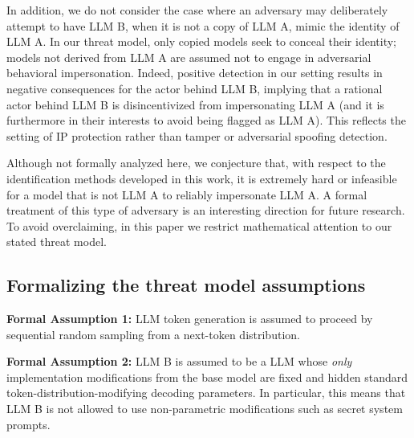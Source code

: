 \documentclass{article}
\begin{document}
In addition, we do not consider the case where an adversary may deliberately attempt to have LLM B, when it is not a copy of LLM A, mimic the identity of LLM A. In our threat model, only copied models seek to conceal their identity; models not derived from LLM A are assumed not to engage in adversarial behavioral impersonation. Indeed, positive detection in our setting results in negative consequences for the actor behind LLM B, implying that a rational actor behind LLM B is disincentivized from impersonating LLM A (and it is furthermore in their interests to avoid being flagged as LLM A). This reflects the setting of IP protection rather than tamper or adversarial spoofing detection.



Although not formally analyzed here, we conjecture that, with respect to the identification methods developed in this work, it is extremely hard or infeasible for a model that is not LLM A to reliably impersonate LLM A. A formal treatment of this type of adversary is an interesting direction for future research. To avoid overclaiming, in this paper we restrict mathematical attention to our stated threat model.



\subsection{Formalizing the threat model assumptions}

\textbf{Formal Assumption 1:} LLM token generation is assumed to proceed by sequential random sampling from a next-token distribution.

\textbf{Formal Assumption 2:} LLM B is assumed to be a LLM whose \textit{only} implementation modifications from the base model are fixed and hidden standard token-distribution-modifying decoding parameters. In particular, this means that LLM B is not allowed to use non-parametric modifications such as secret system prompts.
\end{document}
